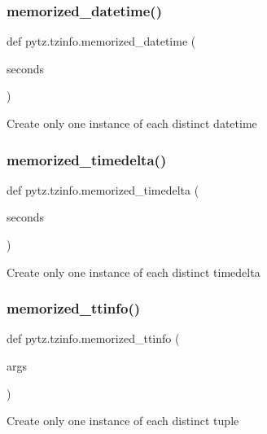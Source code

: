 \subsubsection{\texorpdfstring{memorized\+\_\+datetime()}{memorized\_datetime()}}
{\footnotesize\ttfamily def pytz.\+tzinfo.\+memorized\+\_\+datetime (\begin{DoxyParamCaption}\item[{}]{seconds }\end{DoxyParamCaption})}

\begin{DoxyVerb}Create only one instance of each distinct datetime\end{DoxyVerb}
 \mbox{\label{namespacepytz_1_1tzinfo_aa88228d1ac2d80c09eff7d1eb0dab7b1}} 
\subsubsection{\texorpdfstring{memorized\+\_\+timedelta()}{memorized\_timedelta()}}
{\footnotesize\ttfamily def pytz.\+tzinfo.\+memorized\+\_\+timedelta (\begin{DoxyParamCaption}\item[{}]{seconds }\end{DoxyParamCaption})}

\begin{DoxyVerb}Create only one instance of each distinct timedelta\end{DoxyVerb}
 \mbox{\label{namespacepytz_1_1tzinfo_a162a0f44b21d1c0ab80ca7b6f319dc83}} 
\subsubsection{\texorpdfstring{memorized\+\_\+ttinfo()}{memorized\_ttinfo()}}
{\footnotesize\ttfamily def pytz.\+tzinfo.\+memorized\+\_\+ttinfo (\begin{DoxyParamCaption}\item[{}]{args }\end{DoxyParamCaption})}

\begin{DoxyVerb}Create only one instance of each distinct tuple\end{DoxyVerb}
 \mbox{\label{namespacepytz_1_1tzinfo_abfa314b5b1f93e87637b0a7378bf078d}} 

